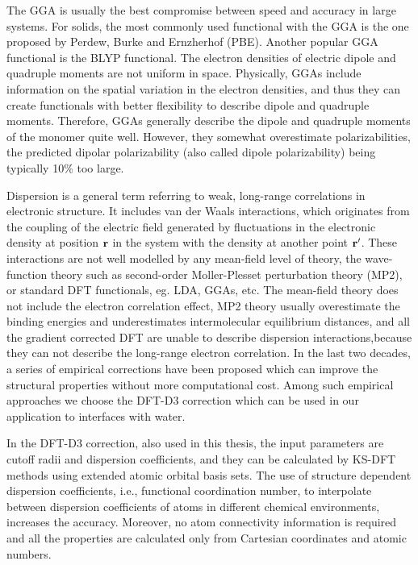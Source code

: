 The GGA is usually the best compromise between speed and accuracy in large systems. For solids, the most commonly used functional
with the GGA is the one proposed by Perdew, Burke and Ernzherhof (PBE)\cite{PBE96}.
Another popular GGA functional is the BLYP functional.  
The electron densities of electric dipole and quadruple moments are not uniform in space.
Physically, GGAs include information on the spatial variation in the electron densities,
and thus they can create functionals with better flexibility to describe dipole and quadruple moments. 
Therefore, GGAs generally describe the dipole and quadruple moments of the monomer quite well. 
However, they somewhat overestimate polarizabilities, the predicted dipolar 
polarizability (also called dipole polarizability) being typically 10\% too large.

Dispersion is a general term referring to weak, long-range correlations in electronic structure. It includes van der Waals interactions,
which originates from the coupling of the electric field generated by fluctuations in the electronic density at position $\bf{r}$ 
in the system with the density at another point $\bf{r'}$\cite{Zeiss1977,Kohanoff06}. These interactions are not well modelled by any mean-field level of theory, 
the \abinitio wave-function theory such as second-order M{o}ller-Plesset perturbation theory (MP2), 
or standard DFT functionals, eg. LDA, GGAs, etc. 
The mean-field theory does not include the electron correlation effect, MP2 theory usually overestimate the binding energies 
and underestimates intermolecular equilibrium distances, and all the gradient corrected DFT are unable to describe dispersion 
interactions,because they can not describe the long-range electron correlation.
In the last two decades, a series of empirical corrections have been proposed which can improve the structural properties 
without more computational cost\cite{WuX01,WuQ02,Zimmerli04,Grimme04,Grimme06,Grimme07,Grimme10}.
Among such empirical approaches we  choose the DFT-D3 correction which can be used in our application to interfaces with water\cite{Grimme10,Klimes2012}.

In the DFT-D3 correction, also used in this thesis, the input parameters are cutoff radii and dispersion coefficients, and they can be calculated by 
KS-DFT methods using extended atomic orbital basis sets. The use of structure dependent dispersion coefficients, 
i.e., functional coordination number, to interpolate between dispersion coefficients of atoms in different chemical environments, 
increases the accuracy.  Moreover, no atom connectivity information is required and all the properties are calculated only 
from Cartesian coordinates and atomic numbers\cite{Grimme10}.

